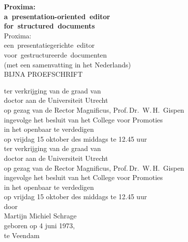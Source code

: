 \newcommand{\engtitle}{Proxima:\\
a~presentation-oriented~editor\\
for~structured~documents}

\newcommand{\nltitle}{Proxima:\\
een~presentatiegerichte~editor\\
voor~gestructureerde~documenten}

\thispagestyle{empty}

\parbox{141mm}{
\begin{center}
  {\sffamily\bfseries\Huge\engtitle\\}
  \vspace{1cm}
  {\sffamily\Large\nltitle\\}
  \vspace{1mm}
  (met een samenvatting in het Nederlands)\\
  \vspace{2cm}
  {\sffamily\Large BIJNA PROEFSCHRIFT\\}

  \vspace{0.2cm}
  
  \vspace{1cm}
  ter verkrijging van de graad van\\
  doctor aan de Universiteit Utrecht\\
  op gezag van de Rector Magnificus, Prof.\,Dr.~W.\,H.~Gispen\\
  ingevolge het besluit van het College voor Promoties\\
  in het openbaar te verdedigen\\
  op vrijdag 15 oktober des middags te 12.45 uur\\
\bc
  ter verkrijging van de graad van\\
  doctor aan de Universiteit Utrecht\\
  op gezag van de Rector Magnificus, Prof.\,Dr.~W.\,H.~Gispen\\
  ingevolge het besluit van het College voor Promoties\\
  in het openbaar te verdedigen\\
  op vrijdag 15 oktober des middags te 12.45 uur\\ \ec
  \vspace{1.5cm} %
  door\\
  \vspace{1.5cm} %
  {\sffamily\Large Martijn Michiel Schrage\\}
  \vspace{1cm}
  geboren op 4 juni 1973,\\
  te Veendam
\end{center}
}

